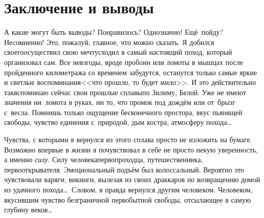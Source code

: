 \chapter{Заключение и выводы}

А какие могут быть выводы? Понравилось? Однозначно! Ещё~пойду? Несомненно! Это, пожалуй, главное, что можно сказать. Я добился своего\mdash осуществил свою мечту\mdash сходил в самый настоящий поход, который организовал сам. Все невзгоды, вроде пробоин или ломоты в мышцах после пройденного километража со временем забудутся, останутся только самые яркие и светлые воспоминания\mdash <<что прошло, то будет мило>>. И это действительно так\mdash вспоминаю сейчас свои прошлые сплавы\mdash по Зилиму, Белой. Уже не имеют значения ни~ломота в руках, ни то, что промок под дождём или от~брызг с~весла. Помнишь только ощущение бесконечного простора, вкус пьянящей свободы, чувство единения с~природой, дым костра, атмосферу похода\ldots 

Чувства, с которыми я вернулся из этого сплава просто не изложить на бумаге. Возможно впервые в жизни я почувствовал в себе не просто некую уверенность, а именно \textit{силу}. Силу человека\sdash первопроходца, путешественника, первооткрывателя. Эмоциональный подъём был колоссальный. Вероятно это чувствовали варяги, викинги, вылезая из своих драккаров по возвращению домой из удачного похода\ldots~Словом, я правда вернулся другим человеком. Человеком, вкусившим чувство безграничной первобытной свободы, отсылающее в самую глубину веков\ldots

